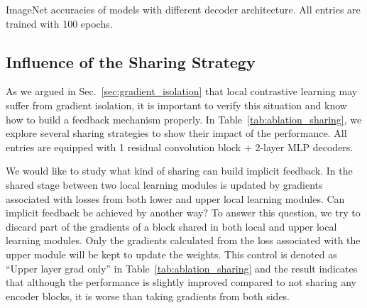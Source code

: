 \begin{table}
\begin{minipage}[t]{0.5\linewidth}
\vspace{0.1in}
\caption{ImageNet accuracies of models with different decoder architecture. All entries are trained
with 100 epochs. }
\label{tab:ablation_conv_blocks}
\end{minipage}
\hfill
\begin{minipage}[t]{0.45\linewidth}
\centering
{}
\vspace{0.1in}
\caption{ImageNet accuracies of models with different sharing strategies. All entries are trained
with 100 epochs.}
\label{tab:ablation_sharing}
\end{minipage}
\vspace{-0.2in}
\end{table}
\fi

\subsection{Influence of the Sharing Strategy} 
As we argued in Sec.~\ref{sec:gradient_isolation} that local contrastive learning may suffer from
gradient isolation, it is important to verify this situation and know how to build a feedback
mechanism properly. In Table~\ref{tab:ablation_sharing}, we explore several sharing strategies to
show their impact of the performance. All entries are equipped with 1 residual convolution block +
2-layer MLP decoders.

We would like to study what kind of sharing can build implicit feedback. In {\ours} the shared stage
between two local learning modules is updated by gradients associated with losses from both lower
and upper local learning modules. Can implicit feedback be achieved by another way? To answer this
question, we try to discard part of the gradients of a block shared in both local and upper local
learning modules. Only the gradients calculated from the loss associated with the upper module will
be kept to update the weights. This control is denoted as ``Upper layer grad only'' in
Table~\ref{tab:ablation_sharing} and the result indicates that although the performance is slightly
improved compared to not sharing any encoder blocks, it is worse than taking gradients from both
sides.

